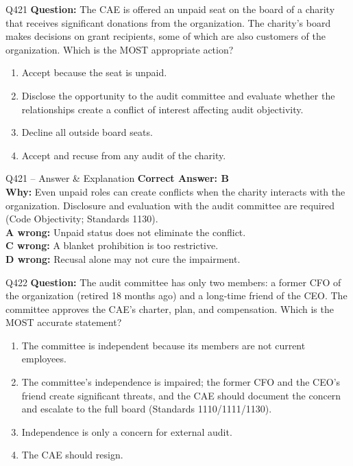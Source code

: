 \documentclass[aspectratio=169,10pt]{beamer}
\begin{document}
	\begin{frame}[t]{Q421}
		\small
		\textbf{Question:} The CAE is offered an unpaid seat on the board of a charity that receives significant donations from the organization. The charity's board makes decisions on grant recipients, some of which are also customers of the organization. Which is the MOST appropriate action?
		\begin{enumerate}[label=\Alph*.,itemsep=1pt,topsep=2pt]
			\item Accept because the seat is unpaid.
			\item Disclose the opportunity to the audit committee and evaluate whether the relationships create a conflict of interest affecting audit objectivity.
			\item Decline all outside board seats.
			\item Accept and recuse from any audit of the charity.
		\end{enumerate}
	\end{frame}
	
	\begin{frame}[t]{Q421 -- Answer \& Explanation}
		\small
		\textbf{Correct Answer: B} \\[4pt]
		\textbf{Why:} Even unpaid roles can create conflicts when the charity interacts with the organization. Disclosure and evaluation with the audit committee are required (Code Objectivity; Standards 1130). \\[4pt]
		\textbf{A wrong:} Unpaid status does not eliminate the conflict. \\[2pt]
		\textbf{C wrong:} A blanket prohibition is too restrictive. \\[2pt]
		\textbf{D wrong:} Recusal alone may not cure the impairment.
	\end{frame}
	
	\begin{frame}[t]{Q422}
		\small
		\textbf{Question:} The audit committee has only two members: a former CFO of the organization (retired 18 months ago) and a long-time friend of the CEO. The committee approves the CAE's charter, plan, and compensation. Which is the MOST accurate statement?
		\begin{enumerate}[label=\Alph*.,itemsep=1pt,topsep=2pt]
			\item The committee is independent because its members are not current employees.
			\item The committee's independence is impaired; the former CFO and the CEO's friend create significant threats, and the CAE should document the concern and escalate to the full board (Standards 1110/1111/1130).
			\item Independence is only a concern for external audit.
			\item The CAE should resign.
		\end{enumerate}
	\end{frame}
	
\end{document}
